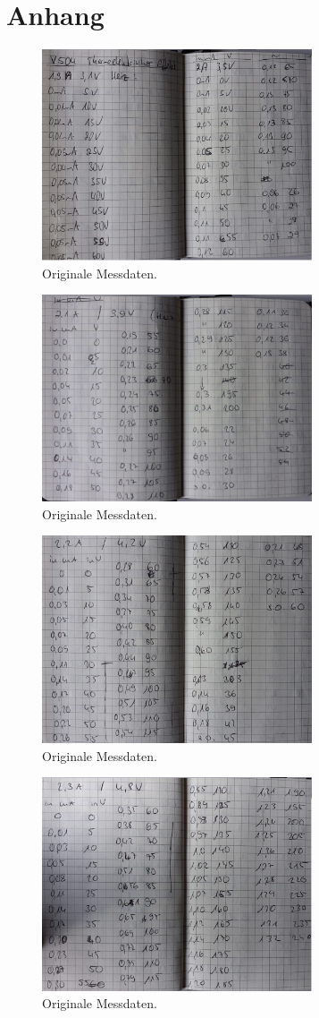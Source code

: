 \section{Anhang}
\begin{figure}[H]
\centering
\includegraphics[width=8cm]{content/a1.png}
\caption{Originale Messdaten.}
\end{figure}
\begin{figure}[H]
\centering
\includegraphics[width=8cm]{content/a2.png}
\caption{Originale Messdaten.}
\end{figure}
\begin{figure}[H]
\centering
\includegraphics[width=8cm]{content/a3.png}
\caption{Originale Messdaten.}
\end{figure}
\begin{figure}[H]
\centering
\includegraphics[width=8cm]{content/a4.png}
\caption{Originale Messdaten.}
\end{figure}
